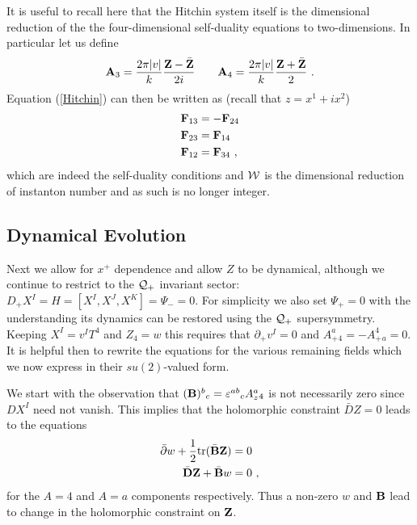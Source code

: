 \documentclass[12pt]{article}
\newcommand{\nn}{\nonumber}
\numberwithin{equation}{section}
\begin{document}
It is useful to recall here that the Hitchin system itself is the dimensional reduction of the the four-dimensional self-duality equations to two-dimensions. In particular let us define
\begin{equation}\label{4DA}
 {\bf A}_3 = \frac{2\pi |v|}{k}\frac{{\bf Z}-\bar {\bf Z}}{2i}\qquad{\bf A}_4 = \frac{2\pi |v|}{k}\frac{{\bf Z} +\bar {\bf Z} }{2}\ .
\end{equation}
Equation (\ref{Hitchin}) can then be written as (recall that $z = x^1+ix^2$)
\begin{align}
{\bf F}_{13} &=- {\bf F}_{24}\nn\\
{\bf F}_{23} &= {\bf F}_{14}\nn\\
{\bf F}_{12} & = {\bf F}_{34}\ ,
\end{align}
which are indeed the self-duality conditions and ${\cal W}$ is the dimensional reduction of instanton number and as such is no longer integer.

\subsection{Dynamical Evolution}

Next we allow for $x^+$ dependence and allow $Z$ to be dynamical, although we continue to restrict to the ${\cal Q}_+$ invariant sector: $D_+X^I=H =[X^I,X^J,X^K]=\Psi_-=0$. For simplicity we also set $\Psi_+=0$ with the understanding its dynamics can be restored using the ${\cal Q}_+$ supersymmetry. Keeping $X^I = v^IT^4$ and $Z_4=w$ this requires that $\partial_+v^I=0$ and  $A_{+}^a{}_4=-A_{+}^4{}_a=0$.  It is helpful then to rewrite the equations for the various remaining fields which we now express in their $su(2)$-valued form.


We start with the observation that $({\bf B})^b{}_c = \varepsilon^{ab}{}_cA^a_z{}_4$ is not necessarily zero since $DX^I$ need not vanish. This implies that the holomorphic constraint ${\bar D}Z=0$ leads to the equations
\begin{align}
\bar\partial w + \frac12{\rm tr}(\bar {\bf B}{\bf Z}) & =0\nn\\
\bar {\bf D}{\bf  Z} +\bar {\bf B} w & =0\ ,
\end{align}
for the $A=4$ and $A=a$ components respectively. Thus a non-zero $w$ and ${\bf B}$ lead to change in the holomorphic constraint on ${\bf Z}$. 
\end{document}
